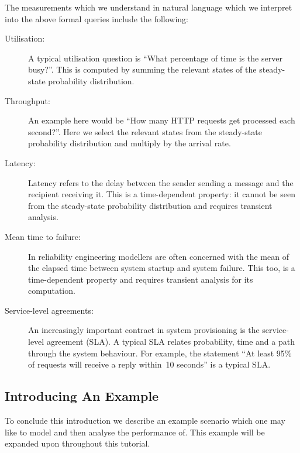 \documentclass[10pt,a4paper]{article}
\begin{document}
The measurements which we understand in natural language which we interpret
into the above formal queries include the following:

\begin{description}
\item[Utilisation:] A typical utilisation question is ``What
percentage of time is the server busy?''.  This is computed by summing
the relevant states of the steady-state probability distribution.

\item[Throughput:] An example here would be ``How many HTTP
requests get processed each second?''.  Here we select the relevant
states from the steady-state probability distribution and multiply by
the arrival rate.

\item[Latency:] Latency refers to the delay between the sender sending
a message and the recipient receiving it.  This is a time-dependent
property: it cannot be seen from the steady-state probability
distribution and requires transient analysis.

\item[Mean time to failure:] In reliability engineering modellers are
often concerned with the mean of the elapsed time between system
startup and system failure.  This too, is a time-dependent property
and requires transient analysis for its computation.  

\item[Service-level agreements:] An increasingly important contract in
system provisioning is the service-level agreement (SLA)\@.  A typical
SLA relates probability, time and a path through the system behaviour.
For example, the statement ``At least 95\% of requests will receive a
reply within~10 seconds'' is a typical SLA\@.

\end{description} 


\subsection{Introducing An Example}
To conclude this introduction we describe an example scenario which
one may like to model and then analyse the performance of.
This example will be expanded upon throughout this tutorial.
\end{document}
